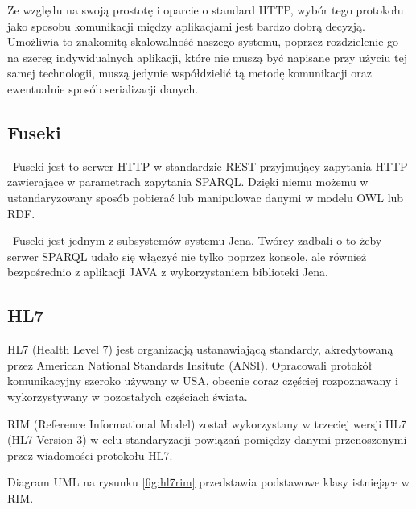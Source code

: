 Ze względu na swoją prostotę i oparcie o standard HTTP, wybór tego protokołu jako sposobu komunikacji między aplikacjami jest bardzo dobrą decyzją. Umożliwia to znakomitą skalowalność naszego systemu, poprzez rozdzielenie go na szereg indywidualnych aplikacji, które nie muszą być napisane przy użyciu tej samej technologii, muszą jedynie współdzielić tą metodę komunikacji oraz ewentualnie sposób serializacji danych.

\subsection{Fuseki}
\label{sec:rest}

~Fuseki jest to serwer HTTP w standardzie REST przyjmujący zapytania HTTP zawierające w parametrach zapytania SPARQL.
Dzięki niemu możemu w ustandaryzowany sposób pobierać lub manipulowac danymi w modelu OWL lub RDF.

~Fuseki jest jednym z subsystemów systemu Jena. Twórcy zadbali o to żeby serwer SPARQL udało się włączyć nie tylko poprzez konsole, ale również bezpośrednio z aplikacji JAVA z wykorzystaniem biblioteki Jena.

\subsection{HL7}
\label{sec:hl7}

HL7 (Health Level 7) jest organizacją ustanawiającą standardy, akredytowaną przez American National Standards Insitute (ANSI). Opracowali protokół komunikacyjny szeroko używany w USA, obecnie coraz częściej rozpoznawany i wykorzystywany w pozostałych częściach świata.

RIM (Reference Informational Model) został wykorzystany w trzeciej wersji HL7 (HL7 Version 3) w celu standaryzacji powiązań pomiędzy danymi przenoszonymi przez wiadomości protokołu HL7.

Diagram UML na rysunku \ref{fig:hl7rim} przedstawia podstawowe klasy istniejące w RIM.

